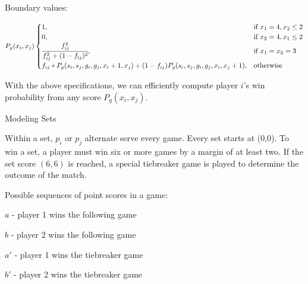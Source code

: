 \documentclass[11pt]{article}
\begin{document}
Boundary values:

\begin{equation}
    P_g(x_i,x_j) 
    \begin{cases}
      1, & \text{if}\ x_1=4,x_2 \leq 2 \\
      0, & \text{if}\ x_2=4,x_1 \leq 2 \\
      \cfrac{f_{ij}^2}{f_{ij}^2+(1-f_{ij})^2}, & \text{if}\ x_1=x_2=3 \\
      f_{ij}*P_g(s_i,s_j,g_i,g_j,{x}_i+1,{x}_j) + (1-f_{ij}) P_g(s_i,s_j,g_i,g_j,{x}_i,{x}_j+1), & \text{otherwise}\ \\
      
    \end{cases}
  \end{equation}

With the above specifications, we can efficiently compute player $i$'s win probability from any score $P_g(x_i,x_j)$.

\item Modeling Sets

Within a set, $p_i$ or $p_j$ alternate serve every game. Every set starts at (0,0). To win a set, a player must win six or more games by a margin of at least two. If the set score $(6,6)$ is reached, a special tiebreaker game is played to determine the outcome of the match.

Possible sequences of point scores in a game:

$a$ - player 1 wins the following game

$b$ - player 2 wins the following game

$a'$ - player 1 wins the tiebreaker game

$b'$ - player 2 wins the tiebreaker game
\end{document}
